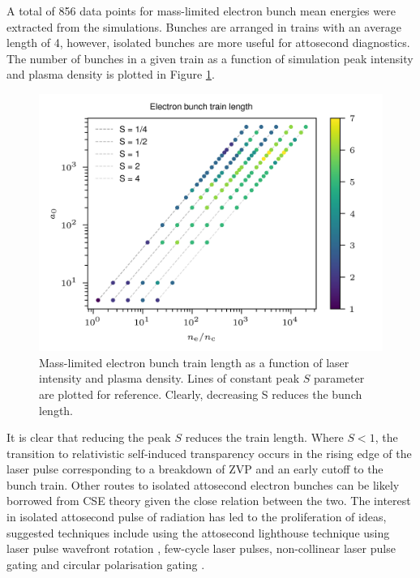 A total of 856 data points for mass-limited electron bunch mean energies were extracted from the simulations. Bunches are arranged in trains with an average length of 4, however, isolated bunches are more useful for attosecond diagnostics. The number of bunches in a given train as a function of simulation peak intensity and plasma density is plotted in Figure \ref{fig:zvpbunchtrainlength}.
\begin{figure}
	\centering
	\includegraphics[width=0.7\linewidth]{figures/zvp/zvp_bunch_train_length}
	\caption[Mass-limited electron bunch train length as a function of laser intensity and plasma density.]{Mass-limited electron bunch train length as a function of laser intensity and plasma density. Lines of constant peak $S$ parameter are plotted for reference. Clearly, decreasing S reduces the bunch length.}
	\label{fig:zvpbunchtrainlength}
\end{figure}
It is clear that reducing the peak $S$ reduces the train length. Where $S <1$, the transition to relativistic self-induced transparency occurs in the rising edge of the laser pulse corresponding to a breakdown of ZVP and an early cutoff to the bunch train. Other routes to isolated attosecond electron bunches can be likely borrowed from CSE theory given the close relation between the two. The interest in isolated attosecond pulse of radiation has led to the proliferation of ideas, suggested techniques include using the attosecond lighthouse technique using laser pulse wavefront rotation \cite{vincentiAttosecondLighthousesHow2012}, few-cycle laser pulses\cite{heisslerFewCycleDrivenRelativistically2012}, non-collinear laser pulse gating \cite{kennedyIsolatedUltrabrightAttosecond2022}  and circular polarisation gating \cite{yeungDependenceLaserDrivenCoherent2014}.

